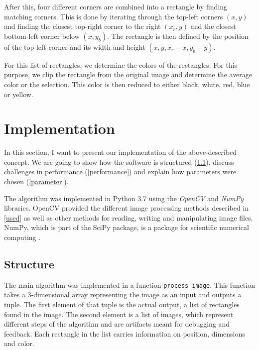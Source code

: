 \documentclass[serif,article,noparskip]{agse-thesis}
\begin{document}
After this, four different corners are combined into a rectangle by finding
matching corners. This is done by iterating through the top-left corners $(x,y)$
and finding the closest top-right corner to the right $(x_r, y)$ and the
closest bottom-left corner below $(x, y_b)$. The rectangle is then defined by
the position of the top-left corner and its width and height
$(x,y,x_r-x,y_b-y)$.

For this list of rectangles, we determine the colors of the rectangles. For this
purpose, we clip the rectangle from the original image and determine the average
color or the selection. This color is then reduced to either black, white, red,
blue or yellow.

\section{Implementation} \label{implementation}

In this section, I want to present our implementation of the above-described
concept. We are going to show how the software is structured
(\ref{structure}), discuss challenges in performance (\ref{performance}) and
explain how parameters were chosen (\ref{parameter}).

The algorithm was implemented in Python 3.7 using the \textit{OpenCV} and
\textit{NumPy} libraries. OpenCV provided the different image processing methods
described in \ref{used} as well as other methods for reading, writing and
manipulating image files. NumPy, which is part of the SciPy package, is a
package for scientific numerical computing \cite{scipy}.

\subsection{Structure} \label{structure}

The main algorithm was implemented in a function \texttt{process\_image}. This
function takes a 3-dimensional array representing the image as an input and
outputs a tuple. The first element of that tuple is the actual output, a list of
rectangles found in the image. The second element is a list of images, which
represent different steps of the algorithm and are artifacts meant for debugging
and feedback. Each rectangle in the list carries information on position, dimensions
and color.
\end{document}
